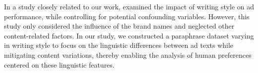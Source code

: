 
In a study closely related to our work, \citet{pryzant-etal-2018-interpretable} examined the impact of writing style on ad performance, while controlling for potential confounding variables. 
However, this study only considered the influence of the brand names and neglected other content-related factors. 
In our study, we constructed a paraphrase dataset varying in writing style to focus on the linguistic differences between ad texts while mitigating content variations, thereby enabling the analysis of human preferences centered on these linguistic features.